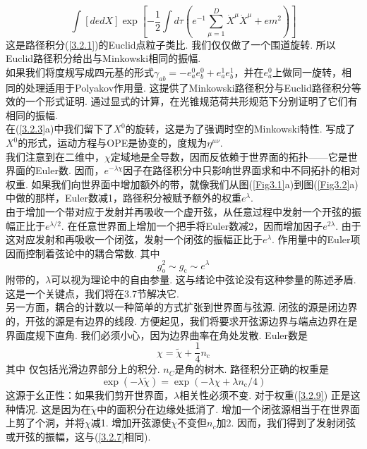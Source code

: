 \begin{equation}
\int[d e d X] \exp \left[-\frac{1}{2} \int d \tau\left(e^{-1} \sum_{\mu=1}^{D} \dot{X}^{\mu} \dot{X}^{\mu}+e m^{2}\right)\right]
\end{equation}
这是路径积分(\ref{3.2.1})的Euclid点粒子类比. 我们仅仅做了一个围道旋转. 所以Euclid路径积分给出与Minkowski相同的振幅. \\
如果我们将度规写成四元基的形式$\gamma_{a b}=-e_{a}^{0} e_{b}^{0}+e_{a}^{1} e_{b}^{1}$，并在$e_a^0$上做同一旋转，相同的处理适用于Polyakov作用量. 这提供了Minkowski路径积分与Euclid路径积分等效的一个形式证明. 通过显式的计算，在光锥规范荷共形规范下分别证明了它们有相同的振幅.\\
在(\ref{3.2.3}a)中我们留下了$X^0$的旋转，这是为了强调时空的Minkowski特性. 写成了$X^0$的形式，运动方程与OPE是协变的，度规为$\eta^{\mu\nu}$. \\
我们注意到在二维中，$\chi$定域地是全导数，因而反依赖于世界面的拓扑——它是世界面的Euler数. 因而，$e^{-\lambda \chi}$因子在路径积分中只影响世界面求和中不同拓扑的相对权重. 如果我们向世界面中增加额外的带，就像我们从图(\ref{Fig3.1}a)到图(\ref{Fig3.2}a)中做的那样，Euler数减1，路径积分被赋予额外的权重$e^\lambda$. \\
由于增加一个带对应于发射并再吸收一个虚开弦，从任意过程中发射一个开弦的振幅正比于$e^{\lambda/2}$. 在任意世界面上增加一个把手将Euler数减2，因而增加因子$e^{2\lambda}$.  由于这对应发射和再吸收一个闭弦，发射一个闭弦的振幅正比于$e^\lambda$. 作用量中的Euler项因而控制着弦论中的耦合常数. 其中
\begin{equation}\label{3.2.7}
g_{\mathrm{o}}^{2} \sim g_{\mathrm{c}} \sim e^{\lambda}
\end{equation}
附带的，$\lambda$可以视为理论中的自由参量. 这与绪论中弦论没有这种参量的陈述矛盾. 这是一个关键点，我们将在3.7节解决它.\\
另一方面，耦合的计数以一种简单的方式扩张到世界面与弦源. 闭弦的源是闭边界的，开弦的源是有边界的线段. 方便起见，我们将要求开弦源边界与端点边界在是界面度规下直角. 我们必须小心，因为边界曲率在角处发散. Euler数是
\begin{equation}
\chi=\tilde{\chi}+\frac{1}{4} n_{\mathrm{c}}
\end{equation}
其中 仅包括光滑边界部分上的积分. $n_C$是角的树木. 路径积分正确的权重是
\begin{equation}\label{3.2.9}
\exp (-\lambda \tilde{\chi})=\exp \left(-\lambda \chi+\lambda n_{\mathrm{c}} / 4\right)
\end{equation}
这源于幺正性：如果我们剪开世界面，$\lambda$相关性必须不变. 对于权重(\ref{3.2.9}) 正是这种情况.
这是因为在$\tilde{\chi}$中的面积分在边缘处抵消了. 增加一个闭弦源相当于在世界面上剪了个洞，并将$\chi$减1. 增加开弦源使$\chi$不变但$n_c$加2. 因而，我们得到了发射闭弦或开弦的振幅，这与(\ref{3.2.7}相同). 


